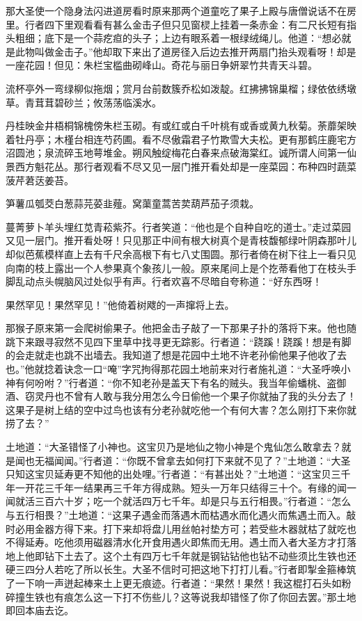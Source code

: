 \documentclass[12pt,UTF8]{ctexbook}
\begin{document}
那大圣使一个隐身法闪进道房看时原来那两个道童吃了果子上殿与唐僧说话不在房里。行者四下里观看看有甚么金击子但只见窗棂上挂着一条赤金：有二尺长短有指头粗细；底下是一个蒜疙疸的头子；上边有眼系着一根绿绒绳儿。他道：“想必就是此物叫做金击子。”他却取下来出了道房径入后边去推开两扇门抬头观看呀！却是一座花园！但见：朱栏宝槛曲砌峰山。奇花与丽日争妍翠竹共青天斗碧。

流杯亭外一弯绿柳似拖烟；赏月台前数簇乔松如泼靛。红拂拂锦巢榴；绿依依绣墩草。青茸茸碧砂兰；攸荡荡临溪水。

丹桂映金井梧桐锦槐傍朱栏玉砌。有或红或白千叶桃有或香或黄九秋菊。荼蘼架映着牡丹亭；木槿台相连芍药圃。看不尽傲霜君子竹欺雪大夫松。更有那鹤庄鹿宅方沼圆池；泉流碎玉地萼堆金。朔风触绽梅花白春来点破海棠红。诚所谓人间第一仙景西方魁花丛。那行者观看不尽又见一层门推开看处却是一座菜园：布种四时蔬菜菠芹莙荙姜苔。

笋薯瓜瓠茭白葱蒜芫荽韭薤。窝蕖童蒿苦荬葫芦茄子须栽。

蔓菁萝卜羊头埋红苋青菘紫芥。行者笑道：“他也是个自种自吃的道士。”走过菜园又见一层门。推开看处呀！只见那正中间有根大树真个是青枝馥郁绿叶阴森那叶儿却似芭蕉模样直上去有千尺余高根下有七八丈围圆。那行者倚在树下往上一看只见向南的枝上露出一个人参果真个象孩儿一般。原来尾间上是个扢蒂看他丁在枝头手脚乱动点头幌脑风过处似乎有声。行者欢喜不尽暗自夸称道：“好东西呀！

果然罕见！果然罕见！”他倚着树飕的一声撺将上去。

那猴子原来第一会爬树偷果子。他把金击子敲了一下那果子扑的落将下来。他也随跳下来跟寻寂然不见四下里草中找寻更无踪影。行者道：“跷蹊！跷蹊！想是有脚的会走就走也跳不出墙去。我知道了想是花园中土地不许老孙偷他果子他收了去也。”他就捻着诀念一口“唵”字咒拘得那花园土地前来对行者施礼道：“大圣呼唤小神有何吩咐？”行者道：“你不知老孙是盖天下有名的贼头。我当年偷蟠桃、盗御酒、窃灵丹也不曾有人敢与我分用怎么今日偷他一个果子你就抽了我的头分去了！这果子是树上结的空中过鸟也该有分老孙就吃他一个有何大害？怎么刚打下来你就捞了去？”

土地道：“大圣错怪了小神也。这宝贝乃是地仙之物小神是个鬼仙怎么敢拿去？就是闻也无福闻闻。”行者道：“你既不曾拿去如何打下来就不见了？”土地道：“大圣只知这宝贝延寿更不知他的出处哩。”行者道：“有甚出处？”土地道：“这宝贝三千年一开花三千年一结果再三千年方得成熟。短头一万年只结得三十个。有缘的闻一闻就活三百六十岁；吃一个就活四万七千年。却是只与五行相畏。”行者道：“怎么与五行相畏？”土地道：“这果子遇金而落遇木而枯遇水而化遇火而焦遇土而入。敲时必用金器方得下来。打下来却将盘儿用丝帕衬垫方可；若受些木器就枯了就吃也不得延寿。吃他须用磁器清水化开食用遇火即焦而无用。遇土而入者大圣方才打落地上他即钻下土去了。这个土有四万七千年就是钢钻钻他也钻不动些须比生铁也还硬三四分人若吃了所以长生。大圣不信时可把这地下打打儿看。”行者即掣金箍棒筑了一下响一声迸起棒来土上更无痕迹。行者道：“果然！果然！我这棍打石头如粉碎撞生铁也有痕怎么这一下打不伤些儿？这等说我却错怪了你了你回去罢。”那土地即回本庙去讫。
\end{document}
